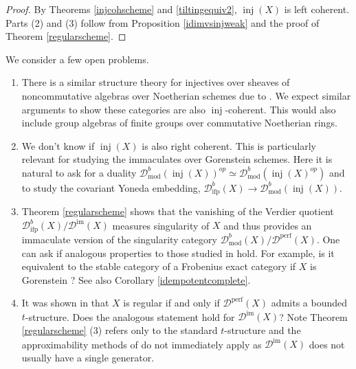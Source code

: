 \documentclass[12pt,oneside]{amsart}
\DeclareMathOperator{\fdmod}{mod}
\DeclareMathOperator{\perf}{perf}
\DeclareMathOperator{\inj}{inj}
\DeclareMathOperator{\immac}{im}
\DeclareMathOperator{\ifp}{ifp}
\begin{document}
\begin{proof}
By Theorems \ref{injcohscheme} and \ref{tiltingequiv2}, $\inj(X)$ is left coherent. Parts (2) and (3) follow from Proposition \ref{idimvsinjweak} and the proof of Theorem \ref{regularscheme}.
\end{proof}



\begin{remark} \label{openqsscheme}We consider a few open problems.
\begin{enumerate}

\item There is a similar structure theory for injectives over sheaves of noncommutative algebras over Noetherian schemes due to \cite{BD22}. We expect similar arguments to show these categories are also $\inj$-coherent. This would also include group algebras of finite groups over commutative Noetherian rings. 

\item We don't know if $\inj(X)$ is also right coherent. This is particularly relevant for studying the immaculates over Gorenstein schemes. Here it is natural to ask for a duality $\mathcal{D}^b_{\fdmod}(\inj(X))^{op} \simeq \mathcal{D}^b_{\fdmod}(\inj(X)^{op})$ and to study the covariant Yoneda embedding, $\mathcal{D}^b_{\ifp}(X) \to \mathcal{D}^b_{\fdmod}(\inj(X))$.


\item Theorem \ref{regularscheme} shows that the vanishing of the Verdier quotient $\mathcal{D}^b_{\ifp}(X)/\mathcal{D}^{\immac}(X)$ measures singularity of $X$ and thus provides an immaculate version of the singularity category $\mathcal{D}^{b}_{\fdmod}(X)/\mathcal{D}^{\perf}(X)$. One can ask if analogous properties to those studied in \cite{Buch21} hold. For example, is it equivalent to the stable category of a Frobenius exact category if $X$ is Gorenstein ? See also Corollary \ref{idempotentcomplete}. 


\item It was shown in \cite{Nee24t-struct} that $X$ is regular if and only if $\mathcal{D}^{\perf}(X)$ admits a bounded $t$-structure. Does the analogous statement hold for $\mathcal{D}^{\immac}(X)$? Note Theorem \ref{regularscheme} (3) refers only to the standard $t$-structure and the approximability methods of \cite{Nee24t-struct} do not immediately apply as $\mathcal{D}^{\immac}(X)$ does not usually have a single generator. 
\end{enumerate}


\end{remark}
\end{document}

